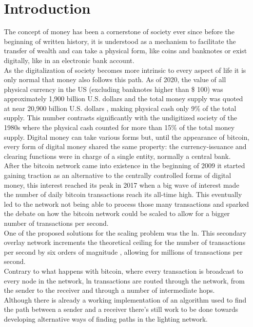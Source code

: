 \section{Introduction}

The concept of money has been a cornerstone of society ever since before the beginning of written history, it is understood as a mechanism to facilitate the transfer of wealth and can take a physical form, like coins and banknotes or exist digitally, like in an electronic bank account. \\
As the digitalization of society becomes more intrinsic to every aspect of life it is only normal that money also follows this path. As of 2020, the value of all physical currency in the US (excluding banknotes higher than \$ 100) was approximately 1,900 billion U.S. dollars \cite{currcir} and the total money supply was quoted at near 20,900 billion U.S. dollars \cite{mzm}, making physical cash only 9\% of the total supply. This number contrasts significantly with the undigitized society of the 1980s where the physical cash counted for more than 15\% of the total money supply.
Digital money can take various forms but, until the appearance of bitcoin, every form of digital money shared the same property: the currency-issuance and clearing functions were in charge of a single entity, normally a central bank. \\
After the bitcoin network came into existence in the beginning of 2009 it started gaining traction as an alternative to the centrally controlled forms of digital money, this interest reached its peak in 2017 when a big wave of interest made the number of daily bitcoin transactions reach its all-time high. This eventually led to the network not being able to process those many transactions and sparked the debate on how the bitcoin network could be scaled to allow for a bigger number of transactions per second. \\
One of the proposed solutions for the scaling problem was the \acrfull{ln}. This secondary overlay network increments the theoretical ceiling for the number of transactions per second by six orders of magnitude \cite{lightning_network}, allowing for millions of transactions per second.\\
Contrary to what happens with bitcoin, where every transaction is broadcast to every node in the network, \acrshort{ln} transactions are routed through the network, from the sender to the receiver and through a number of intermediate hops.\\
Although there is already a working implementation of an algorithm used to find the path between a sender and a receiver there's still work to be done towards developing alternative ways of finding paths in the lighting network.

